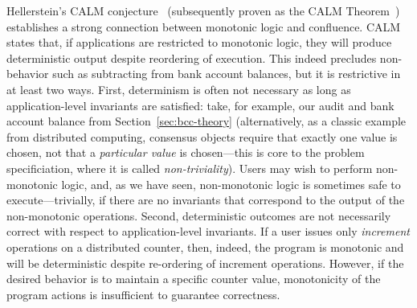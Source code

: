  Hellerstein's CALM conjecture~\cite{calm}
(subsequently proven as the CALM Theorem~\cite{ameloot-calm})
establishes a strong connection between monotonic logic and
confluence. CALM states that, if applications are restricted to
monotonic logic, they will produce deterministic output despite
reordering of execution. This indeed precludes non-\iconfluent
behavior such as subtracting from bank account balances, but it is
restrictive in at least two ways. First, determinism is often not
necessary as long as application-level invariants are satisfied: take,
for example, our audit and bank account balance from
Section~\ref{sec:bcc-theory} (alternatively, as a classic example from
distributed computing, consensus objects require that exactly one
value is chosen, not that a \textit{particular value} is chosen---this
is core to the problem specificiation, where it is called
\textit{non-triviality}). Users may wish to perform non-monotonic
logic, and, as we have seen, non-monotonic logic is sometimes safe to
execute---trivially, if there are no invariants that correspond to the
output of the non-monotonic operations. Second, deterministic outcomes
are not necessarily correct with respect to application-level
invariants. If a user issues only \textit{increment} operations on a
distributed counter, then, indeed, the program is monotonic and will
be deterministic despite re-ordering of increment operations. However,
if the desired behavior is to maintain a specific counter value,
monotonicity of the program actions is insufficient to guarantee
correctness.
